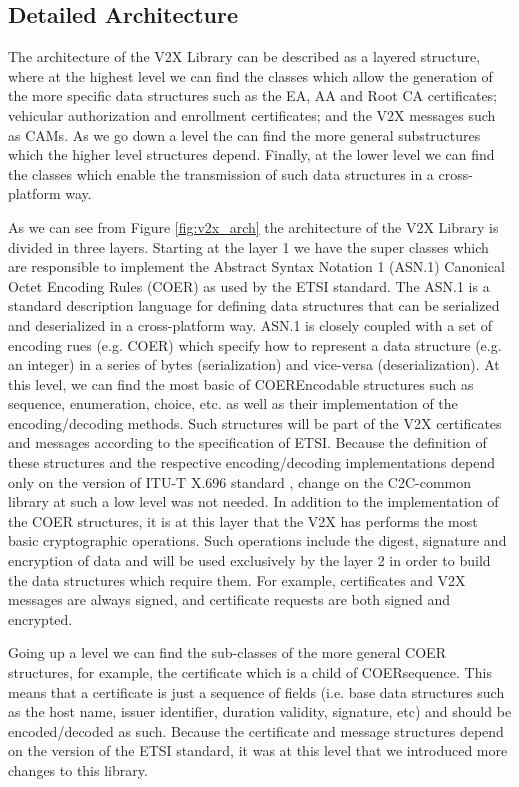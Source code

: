 \subsection{Detailed Architecture}
The architecture of the V2X Library can be described as a layered structure, where at the highest level we can find the classes which allow the generation of the more specific data structures such as the EA, AA and Root CA certificates; vehicular authorization and enrollment certificates; and the V2X messages such as CAMs. As we go down a level the can find the more general substructures which the higher level structures depend. Finally, at the lower level we can find the classes which enable the transmission of such data structures in a cross-platform way.

As we can see from Figure \ref{fig:v2x_arch} the architecture of the V2X Library is divided in three layers. Starting at the layer 1 we have the super classes which are responsible to implement the Abstract Syntax Notation 1 (ASN.1) Canonical Octet Encoding Rules (COER) as used by the ETSI standard. The ASN.1 is a standard description language for defining data structures that can be serialized and deserialized in a cross-platform way. ASN.1 is closely coupled with a set of encoding rues (e.g. COER) which specify how to represent a data structure (e.g. an integer) in a series of bytes (serialization) and vice-versa (deserialization). At this level, we can find the most basic of COEREncodable structures such as sequence, enumeration, choice, etc. as well as their implementation of the encoding/decoding methods. Such structures will be part of the V2X certificates and messages according to the specification of ETSI. Because the definition of these structures and the respective encoding/decoding implementations depend only on the version of ITU-T X.696 standard \cite{coer_standard}, change on the C2C-common library at such a low level was not needed. In addition to the implementation of the COER structures, it is at this layer that the V2X has performs the most basic cryptographic operations. Such operations include the digest, signature and encryption of data and will be used exclusively by the layer 2 in order to build the data structures which require them. For example, certificates and V2X messages are always signed, and certificate requests are both signed and encrypted. 

Going up a level we can find the sub-classes of the more general COER structures, for example, the certificate which is a child of COERsequence. This means that a certificate is just a sequence of fields (i.e. base data structures such as the host name, issuer identifier, duration validity, signature, etc) and should be encoded/decoded as such. Because the certificate and message structures depend on the version of the ETSI standard, it was at this level that we introduced more changes to this library. 

